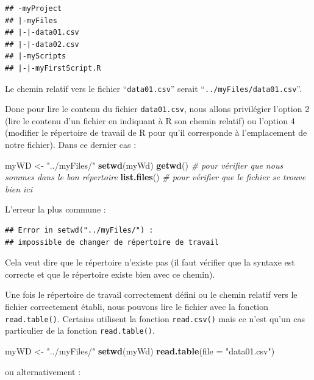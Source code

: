 \documentclass[
]{book}
\newenvironment{Shaded}{\begin{snugshade}}{\end{snugshade}}
\newcommand{\CommentTok}[1]{\textcolor[rgb]{0.56,0.35,0.01}{\textit{#1}}}
\newcommand{\DataTypeTok}[1]{\textcolor[rgb]{0.13,0.29,0.53}{#1}}
\newcommand{\KeywordTok}[1]{\textcolor[rgb]{0.13,0.29,0.53}{\textbf{#1}}}
\newcommand{\NormalTok}[1]{#1}
\newcommand{\StringTok}[1]{\textcolor[rgb]{0.31,0.60,0.02}{#1}}
\begin{document}
\begin{verbatim}
## -myProject
## |-myFiles
## |-|-data01.csv
## |-|-data02.csv
## |-myScripts
## |-|-myFirstScript.R
\end{verbatim}

Le chemin relatif vers le fichier ``\texttt{data01.csv}'' serait ``\texttt{../myFiles/data01.csv}''.

Donc pour lire le contenu du fichier \texttt{data01.csv}, nous allons privilégier l'option 2 (lire le contenu d'un fichier en indiquant à R son chemin relatif) ou l'option 4 (modifier le répertoire de travail de R pour qu'il corresponde à l'emplacement de notre fichier). Dans ce dernier cas :

\begin{Shaded}
\begin{Highlighting}[]
\NormalTok{myWD <-}\StringTok{ "../myFiles/"}
\KeywordTok{setwd}\NormalTok{(myWd)}
\KeywordTok{getwd}\NormalTok{() }\CommentTok{# pour vérifier que nous sommes dans le bon répertoire}
\KeywordTok{list.files}\NormalTok{() }\CommentTok{# pour vérifier que le fichier se trouve bien ici}
\end{Highlighting}
\end{Shaded}

L'erreur la plus commune :

\begin{verbatim}
## Error in setwd("../myFiles/") : 
## impossible de changer de répertoire de travail
\end{verbatim}

Cela veut dire que le répertoire n'existe pas (il faut vérifier que la syntaxe est correcte et que le répertoire existe bien avec ce chemin).

Une fois le répertoire de travail correctement défini ou le chemin relatif vers le fichier correctement établi, nous pouvons lire le fichier avec la fonction \texttt{read.table()}. Certains utilisent la fonction \texttt{read.csv()} mais ce n'est qu'un cas particulier de la fonction \texttt{read.table()}.

\begin{Shaded}
\begin{Highlighting}[]
\NormalTok{myWD <-}\StringTok{ "../myFiles/"}
\KeywordTok{setwd}\NormalTok{(myWd)}
\KeywordTok{read.table}\NormalTok{(}\DataTypeTok{file =} \StringTok{"data01.csv"}\NormalTok{)}
\end{Highlighting}
\end{Shaded}

ou alternativement :
\end{document}
